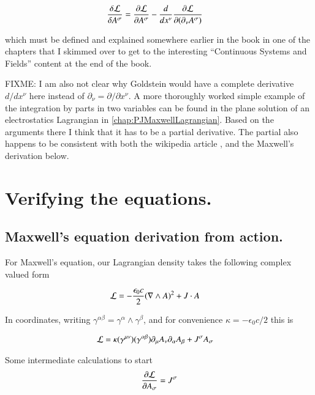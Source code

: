 \begin{align*}
\frac{\delta \mathcal{L}}{\delta A^\sigma} &= \frac{\partial {\mathcal{L}}}{\partial {A^\sigma}} - \frac{d}{dx^\nu} \frac{\partial {\mathcal{L}}}{\partial {(\partial_\nu A^\sigma)}}
\end{align*}

which must be defined and explained somewhere earlier in the book in one of the chapters that I skimmed over to get to the interesting ``Continuous Systems and Fields'' content
at the end of the book.

FIXME: I am also not clear why Goldstein would have a complete derivative $d/dx^\nu$ here instead of $\partial_\nu = \partial/{\partial x^\nu}$.  A more thoroughly worked simple example
of the integration by parts in two variables can be found in the plane solution of an electrostatics Lagrangian in \ref{chap:PJMaxwellLagrangian}.  Based on the arguments there I think that it has to be a partial derivative.   The partial also happens to be consistent with both the wikipedia article \cite{wikiemtensor}, and the Maxwell's derivation below.

\section{Verifying the equations. }
\subsection{Maxwell's equation derivation from action. }

For Maxwell's equation, our Lagrangian density takes the following complex valued form

\begin{align}\label{eqn:fieldLag:maxlag}
\mathcal{L} &= -\frac{\epsilon_0 c}{2} (\nabla \wedge A)^2 + J \cdot A
\end{align}

In coordinates, writing $\gamma^{\alpha\beta} = \gamma^\alpha \wedge \gamma^\beta$, and 
for convenience $\kappa = -\epsilon_0 c /2$ this is

\begin{align}\label{eqn:fieldLag:maxlagcomp}
\mathcal{L} &= \kappa (\gamma^{\mu\nu}) (\gamma^{\alpha\beta}) \partial_\mu A_\nu \partial_\alpha A_\beta + J^\sigma A_\sigma
\end{align}

Some intermediate calculations to start
\begin{align*}
\frac{\partial {\mathcal{L}}}{\partial {A_\sigma}} = J^\sigma
\end{align*}

